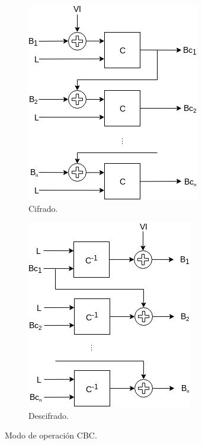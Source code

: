 \begin{figure}[H]
  \centering
  \begin{subfigure}{0.45\textwidth}
      \begin{center}
          \includegraphics[width=0.7\linewidth]
            {contenidos/antecedentes/diagramas/modo_cbc.png}
          \caption{Cifrado.}
      \end{center}
  \end{subfigure}
  \begin{subfigure}{0.45\textwidth}
      \begin{center}
          \includegraphics[width=0.7\linewidth]
            {contenidos/antecedentes/diagramas/modo_cbc_inverso.png}
          \caption{Descifrado.}
      \end{center}
  \end{subfigure}
  \caption{Modo de operación CBC.}
  \label{figura:cbc}
\end{figure}

